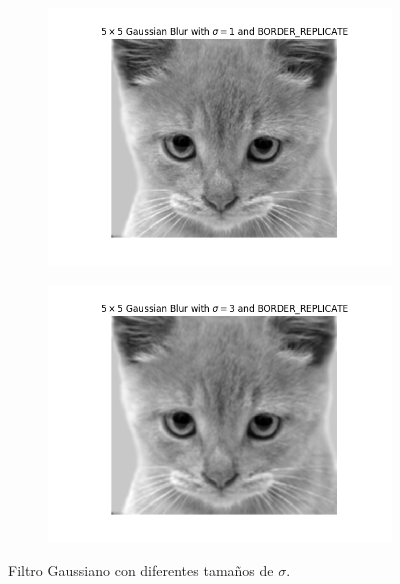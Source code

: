 \documentclass[11pt,a4paper]{article}
\begin{document}
\begin{figure}[H]
\begin{subfigure}{.5\textwidth}
	\centering
	\includegraphics[scale=0.48]{img/gauss-sigma1.png}
	\label{fig:gauss-sigma1}
\end{subfigure}
\begin{subfigure}{.5\textwidth}
	\centering
	\includegraphics[scale=0.48]{img/gauss-sigma2.png}
	\label{fig:gauss-sigma2}
\end{subfigure}
\caption{Filtro Gaussiano con diferentes tamaños de $\sigma$.}
\label{fig:gauss-sigma}
\end{figure}
\end{document}
